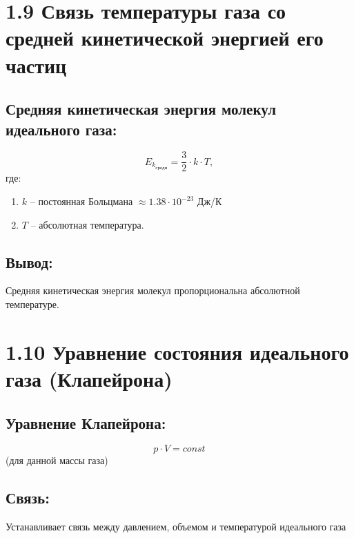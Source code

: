 \documentclass[a4paper,12pt]{article}
\begin{document}
\section*{1.9 Связь температуры газа со средней кинетической энергией его частиц}

\vspace{-9pt}
\subsection*{Средняя кинетическая энергия молекул идеального газа:}
\vspace{-3pt}
$$E_{k_{средн}} = \frac{3}{2} \cdot k\cdot T,$$ 
где:
\begin{enumerate}
    \item $k$ – постоянная Больцмана $\approx 1.38 \cdot 10^{-23}$ Дж/К
    \item $T$ – абсолютная температура.
\end{enumerate}

\vspace{-9pt}
\subsection*{Вывод:}
\vspace{-3pt}
Средняя кинетическая энергия молекул пропорциональна абсолютной температуре.




\newpage


\section*{1.10 Уравнение состояния идеального газа (Клапейрона)}

\vspace{-9pt}
\subsection*{Уравнение Клапейрона:}
\vspace{-3pt}
$$p \cdot V = const$$ 
\vspace{-3pt} 
(для данной массы газа)

\vspace{-9pt}
\subsection*{Связь:}
\vspace{-3pt} Устанавливает связь между давлением, объемом и температурой идеального газа
\end{document}
